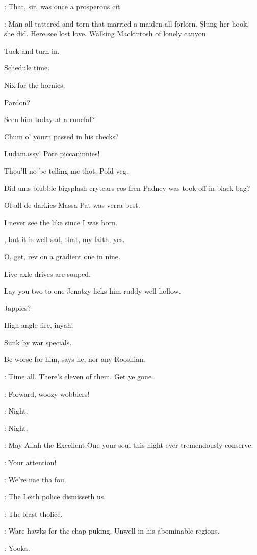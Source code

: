 \lynch: That, sir, was once a prosperous cit.

\Bloom: Man all tattered and torn that married a maiden all forlorn.
Slung her hook, she did.
Here see lost love.
Walking Mackintosh of lonely canyon.

Tuck and turn in.

Schedule time.

Nix for the hornies.

Pardon?

Seen him today at a runefal?

Chum o' yourn passed in his checks?

Ludamassy! Pore piccaninnies!

Thou'll no be telling me thot, Pold veg.

Did ums blubble bigsplash crytears cos fren Padney
was took off in black bag?

Of all de darkies Massa Pat was verra best.

I never see the like since I was born.

, but it is well sad, that, my faith, yes.

O, get, rev on a gradient one in nine.

Live axle drives are souped.

Lay you two to one Jenatzy licks him ruddy well hollow.

Jappies?

High angle fire, inyah!

Sunk by war specials.

Be worse for him, says he, nor any Rooshian.

\barman: Time all. There's eleven of them. Get ye gone.

\lenehan: Forward, woozy wobblers!

\lynch: Night.

\punch: Night.

\dixon: May Allah the Excellent One your soul this night ever
tremendously conserve.


\lenehan: Your attention!

\crotthers: We're nae tha fou.

\lynch: The Leith police dismisseth us.

\lenehan: The least tholice.

\punch: Ware hawks for the chap puking.
Unwell in his abominable regions.

\stephen: Yooka.

